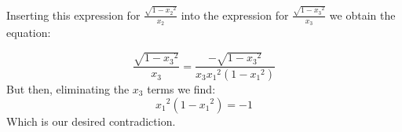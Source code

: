 \documentclass{report}
\begin{document}
Inserting this expression for $\frac{\sqrt{1-{x_2}^2}}{x_2}$ into
the expression for $\frac{\sqrt{1-{x_3}^2}}{x_3}$ we obtain the
equation:

\begin{equation}
\frac{\sqrt{1-{x_3}^2}}{x_3} = \frac{-\sqrt{1-{x_3}^2}}{x_3 {x_1}^2  (1-{x_1}^2)}
\end{equation}
But then, eliminating the $x_3$ terms we find:
\begin{equation}
{x_1}^2 (1-{x_1}^2) = -1
\end{equation}
Which is our desired contradiction.
\end{document}
